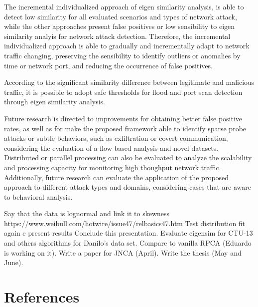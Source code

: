 \documentclass[review]{elsarticle}
\begin{document}
The incremental individualized approach of eigen similarity analysis, is able to detect low similarity for all evaluated scenarios and types of network attack, while the other approaches present false positives or low sensibility to eigen similarity analyis for network attack detection. Therefore, the incremental individualized approach is able to gradually and incrementally adapt to network traffic changing, preserving the sensibility to identify outliers or anomalies by time or network port, and reducing the occurrence of false positives.

According to the significant similarity difference between legitimate and malicious traffic, it is possible to adopt safe thresholds for flood and port scan detection through eigen similarity analysis.

Future research is directed to improvements for obtaining better false positive rates, as well as for make the proposed framework able to identify sparse probe attacks or subtle behaviors, such as exfiltration or covert communication, considering the evaluation of a flow-based analysis and novel datasets. Distributed or parallel processing can also be evaluated to analyze the scalability and processing capacity for monitoring high thoughput network traffic. Additionally, future research can evaluate the application of the proposed approach to different attack types and domains, considering cases that are aware to behavioral analysis.


Say that the data is lognormal \cite{benson2010network} and link it to skewness https://www.weibull.com/hotwire/issue47/relbasics47.htm
Test distribution fit again e present results
Conclude this presentation.
Evaluate eigensim for CTU-13 and others algorithms for Danilo's data set.
Compare to vanilla RPCA (Eduardo is working on it).
Write a paper for JNCA (April).
Write the thesis (May and June).


\section*{References}


\end{document}
